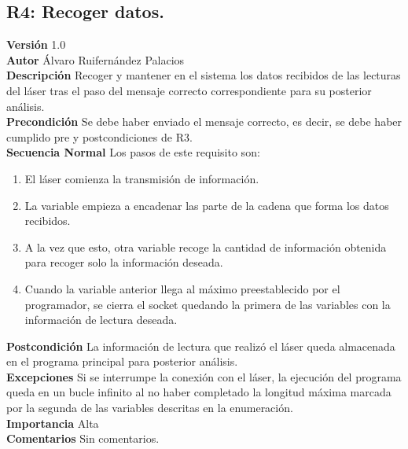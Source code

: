 \subsection{R4: Recoger datos.}
\textbf{Versión} 1.0\\
\textbf{Autor} Álvaro Ruifernández Palacios\\
\textbf{Descripción} Recoger y mantener en el sistema los datos recibidos de las lecturas del láser tras el paso del mensaje correcto correspondiente para su posterior análisis.\\
\textbf{Precondición} Se debe haber enviado el mensaje correcto, es decir, se debe haber cumplido pre y postcondiciones de R3.\\
\textbf{Secuencia Normal} Los pasos de este requisito son:
\begin{enumerate}
	\item El láser comienza la transmisión de información.
	\item La variable empieza a encadenar las parte de la cadena que forma los datos recibidos.
	\item  A la vez que esto, otra variable recoge la cantidad de información obtenida para recoger solo la información deseada.
	\item Cuando la variable anterior llega al máximo preestablecido por el programador, se cierra el socket quedando la primera de las variables con la información de lectura deseada.
\end{enumerate}
\textbf{Postcondición} La información de lectura que realizó el láser queda almacenada en el programa principal para posterior análisis.\\
\textbf{Excepciones} Si se interrumpe la conexión con el láser, la ejecución del programa queda en un bucle infinito al no haber completado la longitud máxima marcada por la segunda de las variables descritas en la enumeración.\\
\textbf{Importancia} Alta\\
\textbf{Comentarios} Sin comentarios.\\

